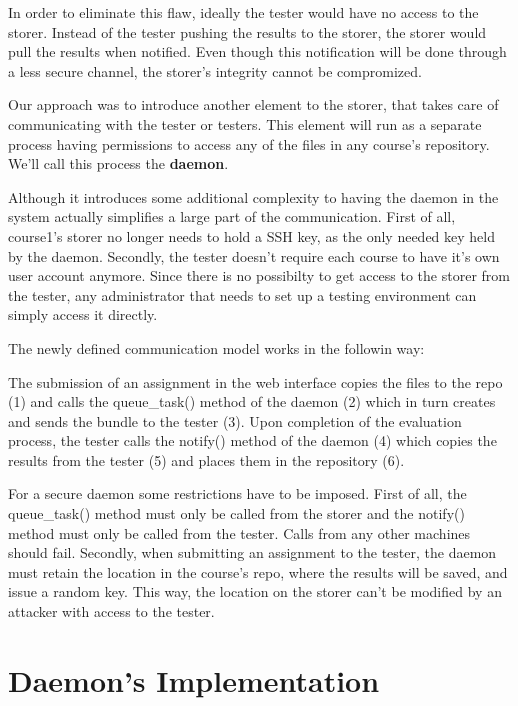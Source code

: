 In order to eliminate this flaw, ideally the tester would have no access to the
storer. Instead of the tester pushing the results to the storer, the storer
would pull the results when notified. Even though this notification will be done
through a less secure channel, the storer's integrity cannot be compromized.

Our approach was to introduce another element to the storer, that takes care
of communicating with the tester or testers. This element will run as a separate
process having permissions to access any of the files in any course's repository.
We'll call this process the \textbf{daemon}.

Although it introduces some additional complexity to 
having the daemon in the system actually simplifies a large part of the communication.
First of all, course1's storer no longer needs to hold a SSH key, as the only needed
key held by the daemon. Secondly, the tester doesn't require each course to have
it's own user account anymore. Since there is no possibilty to get access to the 
storer from the tester, any administrator that needs to set up a testing environment
can simply access it directly.

The newly defined communication model works in the followin way:

The submission of an assignment in the web interface copies the files to the
repo (1) and calls the queue_task() method of the daemon (2) which in turn
creates and sends the bundle to the tester (3).
Upon completion of the evaluation process, the tester calls the notify() 
method of the daemon (4) which copies the results from the tester (5)
and places them in the repository (6).

For a secure daemon some restrictions have to be imposed. First of all, the 
queue_task() method must only be called from the storer and the
notify() method must only be called from the tester. Calls from any other
machines should fail. Secondly, when submitting an assignment to the tester,
the daemon must retain the location in the course's repo, where the results will
be saved, and issue a random key. This way, the location on the storer can't be
modified by an attacker with access to the tester.


\begin{center}
\end{center}


\section{Daemon's Implementation}
\label{sec:vmc-daemon}

